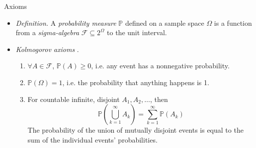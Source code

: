 \documentclass{beamer}
\begin{document}
\begin{frame}{Axioms}
    \begin{itemize}
        \item
        \textit{Definition.} A \textit{probability measure} $ \mathbb{P} $
        defined on a sample space $ \Omega $ is a function from a
        \textit{sigma-algebra} $ \mathcal{F} \subseteq 2^\Omega $ to the unit
        interval.

        \item
        \textit{Kolmogorov axioms} \cite{all_of_stats}.
        \begin{enumerate}
            \item
            $ \forall A \in \mathcal{F} $, $ \mathbb{P}(A) \ge 0 $, i.e. any
            event has a nonnegative probability.

            \item
            $ \mathbb{P}(\Omega) = 1 $, i.e. the probability that anything
            happens is 1.

            \item
            For countable infinite, disjoint $ A_1, A_2, \ldots $, then
            \begin{equation*}
                \mathbb{P}\left(\bigcup_{k = 1}^\infty A_k\right) =
                \sum_{k = 1}^\infty\mathbb{P}(A_k)
            \end{equation*}
            The probability of the union of mutually disjoint events is equal
            to the sum of the individual events' probabilities.
        \end{enumerate}
    \end{itemize}
\end{frame}
\end{document}
